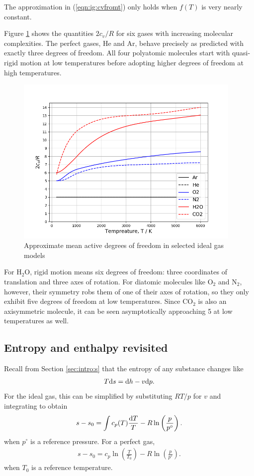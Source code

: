 The approximation in (\ref{eqn:ig:cvfromt}) only holds when $f(T)$ is very nearly constant. 

Figure \ref{fig:dof} shows the quantities $2 c_v / R$ for six gases with increasing molecular complexities.  The perfect gases, He and Ar, behave precisely as predicted with exactly three degrees of freedom.  All four polyatomic molecules start with quasi-rigid motion at low temperatures before adopting higher degrees of freedom at high temperatures.

\begin{figure}
\centering
\includegraphics[width=0.97\textwidth]{figures/dof}
\caption{Approximate mean active degrees of freedom in selected ideal gas models}\label{fig:dof}
\end{figure}

For H$_2$O, rigid motion means six degrees of freedom: three coordinates of translation and three axes of rotation.  For diatomic molecules like O$_2$ and N$_2$, however, their symmetry robs them of one of their axes of rotation, so they only exhibit five degrees of freedom at low temperatures.  Since CO$_2$ is also an axisymmetric molecule, it can be seen asymptotically approaching 5 at low temperatures as well.

\subsection{Entropy and enthalpy revisited}\label{sec:ig:hs}

Recall from Section \ref{sec:intro:s} that the entropy of any substance changes like
\begin{align}
T \mathrm{d} s = \mathrm{d} h - v \mathrm{d} p\nonumber.
\end{align}
For the ideal gas, this can be simplified by substituting $R T / p$ for $v$ and integrating to obtain
\begin{align}
s - s_0 = \int c_p(T)\frac{\mathrm{d} T}{T} - R \ln \left( \frac{p}{p^\circ} \right)\label{eqn:ig:s}.
\end{align}
when $p^\circ$ is a reference pressure.  For a perfect gas,
\begin{align}
s - s_0 = c_p \ln\left( \frac{T}{T_0} \right) - R \ln\left( \frac{p}{p^\circ} \right)\label{eqn:pg:s}.
\end{align}
when $T_0$ is a reference temperature.

